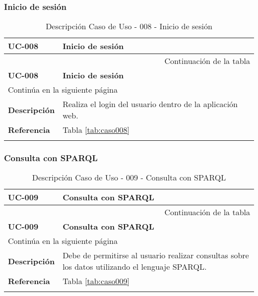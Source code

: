 \subsubsection{Inicio de sesión}

\begin{center}
\begin{longtable}{||p{3.4cm}|p{12cm}||}
 \hline \hline \bf UC-008 &  \bf Inicio de sesión \\
\hline
\endfirsthead
\hline \multicolumn{2}{|r|}{{Continuación de la tabla}} \\ \hline
 \hline \bf UC-008 &  \bf Inicio de sesión \\
\hline
\endhead
\hline \multicolumn{2}{|l|}{{Continúa en la siguiente página}} \\ \hline
\endfoot
\endlastfoot
 \hline \bf Descripción & Realiza el login del usuario dentro de la aplicación
        web.\\
 \hline \bf Referencia & Tabla \ref{tab:caso008}\\
\hline
\hline
\caption{\label{tab:caso008-red} Descripción Caso de Uso - 008 - Inicio de sesión} 
\end{longtable}
\end{center}


\subsubsection{Consulta con SPARQL}

\begin{center}
\begin{longtable}{||p{3.4cm}|p{12cm}||}
 \hline \hline \bf UC-009 &  \bf Consulta con SPARQL \\
\hline
\endfirsthead
\hline \multicolumn{2}{|r|}{{Continuación de la tabla}} \\ \hline
 \hline \bf UC-009 &  \bf Consulta con SPARQL \\
\hline
\endhead
\hline \multicolumn{2}{|l|}{{Continúa en la siguiente página}} \\ \hline
\endfoot
\endlastfoot
 \hline \bf Descripción & Debe de permitirse al usuario realizar consultas sobre
        los datos utilizando el lenguaje SPARQL.\\
 \hline \bf Referencia & Tabla \ref{tab:caso009}\\
\hline
\hline
\caption{\label{tab:caso009-red} Descripción Caso de Uso - 009 - Consulta con SPARQL} 
\end{longtable}
\end{center}


